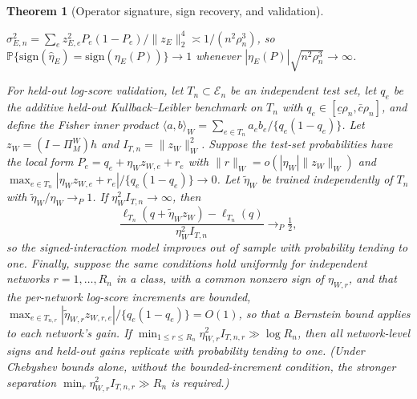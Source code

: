 \documentclass[12pt]{article}
\newtheorem{theorem}{Theorem}
\newcommand{\1}{\mathbf{1}}
\begin{document}
\begin{theorem}[Operator signature, sign recovery, and validation]
\begin{enumerate}
$\sigma_{E,n}^2=\sum_e z_{E,e}^2 P_e(1-P_e)/\|z_E\|_2^4\asymp 1/(n^2\rho_n^3)$, so
$\mathbb P\{\mathrm{sign}(\widehat\eta_E)=\mathrm{sign}(\eta_E(P))\}\to 1$ whenever
$|\eta_E(P)|\sqrt{n^2\rho_n^3}\to\infty$.
\end{enumerate}
For held-out log-score validation, let $T_n\subset\mathcal E_n$ be an independent test set, let $q_e$ be the
additive held-out Kullback--Leibler benchmark on $T_n$ with $q_e\in[\underline c\rho_n,\bar c\rho_n]$, and
define the Fisher inner product $\langle a,b\rangle_W=\sum_{e\in T_n}a_e b_e/\{q_e(1-q_e)\}$. Let
$z_W=(I-\Pi_M^W)h$ and $I_{T,n}=\|z_W\|_W^2$. Suppose the test-set probabilities have the local form
$P_e=q_e+\eta_W z_{W,e}+r_e$ with $\|r\|_W=o(|\eta_W|\|z_W\|_W)$ and
$\max_{e\in T_n}|\eta_W z_{W,e}+r_e|/\{q_e(1-q_e)\}\to 0$. Let $\widetilde\eta_W$ be trained independently of
$T_n$ with $\widetilde\eta_W/\eta_W\to_P 1$. If $\eta_W^2 I_{T,n}\to\infty$, then
\[
    \frac{\ell_{T_n}(q+\widetilde\eta_W z_W)-\ell_{T_n}(q)}{\eta_W^2 I_{T,n}}\to_P\tfrac12,
\]
so the signed-interaction model improves out of sample with probability tending to one. Finally, suppose
the same conditions hold uniformly for independent networks $r=1,\dots,R_n$ in a class, with a common
nonzero sign of $\eta_{W,r}$, and that the per-network log-score increments are bounded,
$\max_{e\in T_{n,r}}|\widetilde\eta_{W,r} z_{W,r,e}|/\{q_e(1-q_e)\}=O(1)$, so that a Bernstein bound applies
to each network's gain. If $\min_{1\le r\le R_n}\eta_{W,r}^2 I_{T,n,r}\gg\log R_n$, then all network-level
signs and held-out gains replicate with probability tending to one. (Under Chebyshev bounds alone, without
the bounded-increment condition, the stronger separation $\min_r\eta_{W,r}^2 I_{T,n,r}\gg R_n$ is required.)
\end{theorem}
\end{document}
